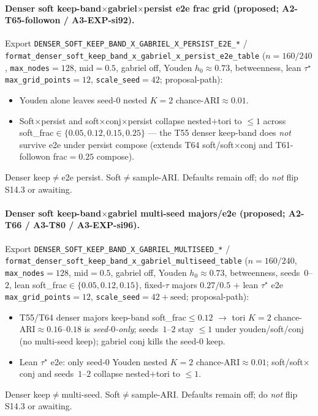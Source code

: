 \documentclass[11pt]{article}
\begin{document}
\paragraph{Denser soft keep-band$\times$gabriel$\times$persist e2e frac
grid (proposed; A2-T65-followon / A3-EXP-si92).}
Export \texttt{DENSER\_SOFT\_KEEP\_BAND\_X\_GABRIEL\_X\_PERSIST\_E2E\_*} /
\texttt{format\_denser\_soft\_keep\_band\_x\_gabriel\_x\_persist\_e2e\_table}
($n{=}160/240$, \texttt{max\_nodes}${=}128$, mid${=}0.5$, gabriel off,
Youden $h_0\approx 0.73$, betweenness, lean $\tau^\star$
\texttt{max\_grid\_points}${=}12$, \texttt{scale\_seed}${=}42$;
proposal-path):
\begin{itemize}[leftmargin=1.5em]
  \item Youden alone leaves seed-$0$ nested $K{=}2$
  chance-ARI$\approx 0.01$.
  \item Soft$\times$persist and soft$\times$conj$\times$persist collapse
  nested$+$tori to $\le 1$ across soft\_frac$\in\{0.05,0.12,0.15,0.25\}$
  --- the T55 denser keep-band does \emph{not} survive e2e under
  persist compose (extends T64 soft/soft$\times$conj and T61-followon
  frac${=}0.25$ compose).
\end{itemize}
Denser keep$\neq$e2e persist. Soft$\neq$sample-ARI. Defaults remain off;
do \emph{not} flip S14.3 or awaiting.

\paragraph{Denser soft keep-band$\times$gabriel multi-seed majors/e2e
(proposed; A2-T66 / A3-T80 / A3-EXP-si96).}
Export \texttt{DENSER\_SOFT\_KEEP\_BAND\_X\_GABRIEL\_MULTISEED\_*} /
\texttt{format\_denser\_soft\_keep\_band\_x\_gabriel\_multiseed\_table}
($n{=}160/240$, \texttt{max\_nodes}${=}128$, mid${=}0.5$, gabriel off,
Youden $h_0\approx 0.73$, betweenness, seeds~$0$--$2$, lean
soft\_frac$\in\{0.05,0.12,0.15\}$, fixed-$\tau$ majors $0.27/0.5$ $+$
lean $\tau^\star$ e2e \texttt{max\_grid\_points}${=}12$,
\texttt{scale\_seed}${=}42{+}\mathrm{seed}$; proposal-path):
\begin{itemize}[leftmargin=1.5em]
  \item T55/T64 denser majors keep-band soft\_frac$\le 0.12$ $\to$ tori
  $K{=}2$ chance-ARI$\approx 0.16$--$0.18$ is \emph{seed-$0$-only};
  seeds~$1$--$2$ stay $\le 1$ under youden/soft/conj (no multi-seed
  keep); gabriel conj kills the seed-$0$ keep.
  \item Lean $\tau^\star$ e2e: only seed-$0$ Youden nested $K{=}2$
  chance-ARI$\approx 0.01$; soft/soft$\times$conj and seeds~$1$--$2$
  collapse nested$+$tori to $\le 1$.
\end{itemize}
Denser keep$\neq$multi-seed. Soft$\neq$sample-ARI. Defaults remain off;
do \emph{not} flip S14.3 or awaiting.
\end{document}
